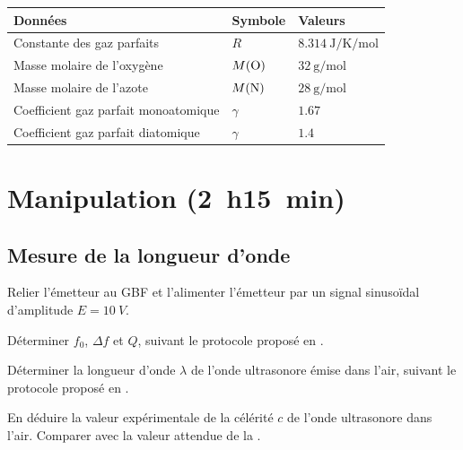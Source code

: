 \begin{protocole}
{  }
\end{protocole}

\begin{tabular}{lll}
  \hline
  \textbf{Données} & \textbf{Symbole} & \textbf{Valeurs} \\
  \hline
  Constante des gaz parfaits & $R$ & $\SI{8.314}{\joule\per\kelvin\per\mole}$ \\
  Masse molaire de l'oxygène & $M({\rm O})$ & $\SI{32}{\gram\per\mole}$ \\
  Masse molaire de l'azote & $M({\rm N})$ & $\SI{28}{\gram\per\mole}$ \\
  Coefficient gaz parfait monoatomique & $\gamma$ & $\num{1.67}$ \\
  Coefficient gaz parfait diatomique & $\gamma$ & $\num{1.4}$ \\[1mm]
  \hline
\end{tabular}

\section{Manipulation (\SI{2}{h}\SI{15}{min})}

\subsection{Mesure de la longueur d'onde}
Relier l'émetteur au GBF et l'alimenter l'émetteur par un signal sinusoïdal d'amplitude $E = \SI{10}{V}$. 
 \begin{protocole}
  \item\label{quest:sinus} Déterminer $f_0$, $\Delta f$ et $Q$, suivant le protocole proposé en .
  \item Déterminer la longueur d'onde $\lambda$ de l'onde ultrasonore émise dans l'air, suivant le protocole proposé en .
  \item En déduire la valeur expérimentale de la célérité $c$ de l'onde ultrasonore dans l'air. Comparer avec la valeur attendue de la .
 \end{protocole}
  

